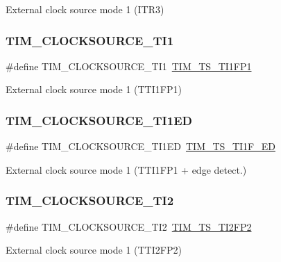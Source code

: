 External clock source mode 1 (I\+T\+R3) \mbox{\label{group___t_i_m___clock___source_ga0a8708d4dab5cbd557a76efb362e13c0}} 
\subsubsection{\texorpdfstring{TIM\_CLOCKSOURCE\_TI1}{TIM\_CLOCKSOURCE\_TI1}}
{\footnotesize\ttfamily \#define T\+I\+M\+\_\+\+C\+L\+O\+C\+K\+S\+O\+U\+R\+C\+E\+\_\+\+T\+I1~\mbox{\hyperlink{group___t_i_m___trigger___selection_ga38d3514d54bcdb0ea8ac8bd91c5832b5}{T\+I\+M\+\_\+\+T\+S\+\_\+\+T\+I1\+F\+P1}}}

External clock source mode 1 (T\+T\+I1\+F\+P1) \mbox{\label{group___t_i_m___clock___source_gad8c96337acf40356d82570cc4851ce2d}} 
\subsubsection{\texorpdfstring{TIM\_CLOCKSOURCE\_TI1ED}{TIM\_CLOCKSOURCE\_TI1ED}}
{\footnotesize\ttfamily \#define T\+I\+M\+\_\+\+C\+L\+O\+C\+K\+S\+O\+U\+R\+C\+E\+\_\+\+T\+I1\+ED~\mbox{\hyperlink{group___t_i_m___trigger___selection_ga8c89554efc693e679c94b5a749af123c}{T\+I\+M\+\_\+\+T\+S\+\_\+\+T\+I1\+F\+\_\+\+ED}}}

External clock source mode 1 (T\+T\+I1\+F\+P1 + edge detect.) \mbox{\label{group___t_i_m___clock___source_ga7950cf616702dd38d8f1ab5091efc012}} 
\subsubsection{\texorpdfstring{TIM\_CLOCKSOURCE\_TI2}{TIM\_CLOCKSOURCE\_TI2}}
{\footnotesize\ttfamily \#define T\+I\+M\+\_\+\+C\+L\+O\+C\+K\+S\+O\+U\+R\+C\+E\+\_\+\+T\+I2~\mbox{\hyperlink{group___t_i_m___trigger___selection_ga0ed58a269bccd3f22d19cc9a2ba3123f}{T\+I\+M\+\_\+\+T\+S\+\_\+\+T\+I2\+F\+P2}}}

External clock source mode 1 (T\+T\+I2\+F\+P2) 